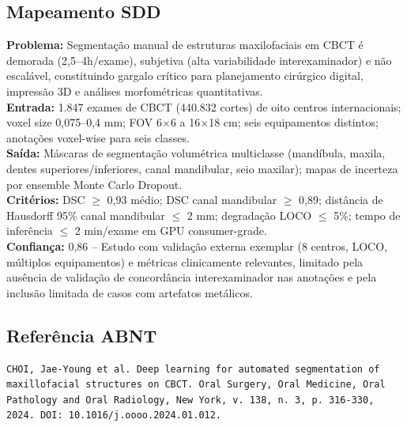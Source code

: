 \subsection{Mapeamento SDD}
\textbf{Problema:} Segmentação manual de estruturas maxilofaciais em CBCT
é demorada (2,5--4h/exame), subjetiva (alta variabilidade interexaminador)
e não escalável, constituindo gargalo crítico para planejamento cirúrgico
digital, impressão 3D e análises morfométricas quantitativas. \\
\textbf{Entrada:} 1.847 exames de CBCT (440.832 cortes) de oito centros
internacionais; voxel size 0,075--0,4 mm; FOV 6$\times$6 a 16$\times$18 cm;
seis equipamentos distintos; anotações voxel-wise para seis classes. \\
\textbf{Saída:} Máscaras de segmentação volumétrica multiclasse
(mandíbula, maxila, dentes superiores/inferiores, canal mandibular, seio
maxilar); mapas de incerteza por ensemble Monte Carlo Dropout. \\
\textbf{Critérios:} DSC $\geq$ 0,93 médio; DSC canal mandibular $\geq$ 0,89;
distância de Hausdorff 95\% canal mandibular $\leq$ 2 mm; degradação
LOCO $\leq$ 5\%; tempo de inferência $\leq$ 2 min/exame em GPU
consumer-grade. \\
\textbf{Confiança:} 0,86 -- Estudo com validação externa exemplar (8
centros, LOCO, múltiplos equipamentos) e métricas clinicamente relevantes,
limitado pela ausência de validação de concordância interexaminador nas
anotações e pela inclusão limitada de casos com artefatos metálicos.

\subsection{Referência ABNT}
\begin{verbatim}
CHOI, Jae-Young et al. Deep learning for automated segmentation of
maxillofacial structures on CBCT. Oral Surgery, Oral Medicine, Oral
Pathology and Oral Radiology, New York, v. 138, n. 3, p. 316-330,
2024. DOI: 10.1016/j.oooo.2024.01.012.
\end{verbatim}
\endinput
